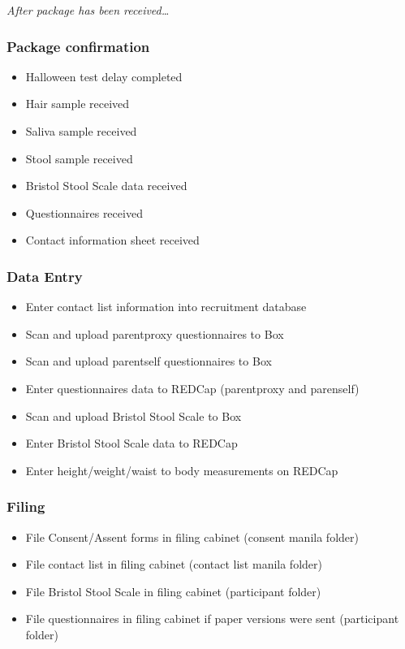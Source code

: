 \documentclass[]{book}
\providecommand{\tightlist}{%
  \setlength{\itemsep}{0pt}\setlength{\parskip}{0pt}}
\begin{document}
\emph{After package has been received\ldots{}}

\hypertarget{package-confirmation}{%
\subsubsection{Package confirmation}\label{package-confirmation}}

\begin{itemize}
\tightlist
\item
  Halloween test delay completed
\item
  Hair sample received
\item
  Saliva sample received
\item
  Stool sample received
\item
  Bristol Stool Scale data received
\item
  Questionnaires received
\item
  Contact information sheet received
\end{itemize}

\hypertarget{data-entry-2}{%
\subsubsection{Data Entry}\label{data-entry-2}}

\begin{itemize}
\tightlist
\item
  Enter contact list information into recruitment database
\item
  Scan and upload parentproxy questionnaires to Box
\item
  Scan and upload parentself questionnaires to Box
\item
  Enter questionnaires data to REDCap (parentproxy and parenself)
\item
  Scan and upload Bristol Stool Scale to Box
\item
  Enter Bristol Stool Scale data to REDCap
\item
  Enter height/weight/waist to body measurements on REDCap
\end{itemize}

\hypertarget{filing-4}{%
\subsubsection{Filing}\label{filing-4}}

\begin{itemize}
\tightlist
\item
  File Consent/Assent forms in filing cabinet (consent manila folder)
\item
  File contact list in filing cabinet (contact list manila folder)
\item
  File Bristol Stool Scale in filing cabinet (participant folder)
\item
  File questionnaires in filing cabinet if paper versions were sent (participant folder)
\end{itemize}
\end{document}
